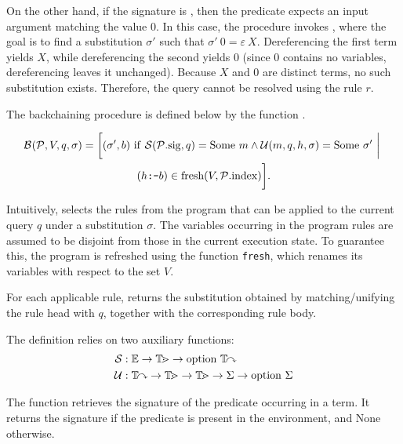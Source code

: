 On the other hand, if the signature is , then the predicate
expects an input argument matching the value $0$. In this case, the procedure
invokes , where the goal is to find a
substitution $\sigma'$ such that $\sigma'\ 0 = \varepsilon\ X$. Dereferencing the
first term yields $X$, while dereferencing the second yields $0$ (since $0$
contains no variables, dereferencing leaves it unchanged). Because $X$ and $0$
are distinct terms, no such substitution exists. Therefore, the query cannot be
resolved using the rule $r$.

The backchaining procedure is defined below by the function \backchain.

\begin{definition}
\begin{multline*}
\backchain(\prog, V, q, \sigma) =
\bigg[
(\sigma', b)\ \mathrm{if}\
 \getmode(\prog.\mathrm{sig}, q) = \mathrm{Some}\ m \land \select(m, q, h, \sigma) = \mathrm{Some}\ \sigma'
\ \bigg|\ \\
(\clauseCmd{h}{}{b}) \in \text{fresh}(V, \prog.\mathrm{index})
\bigg].
\end{multline*}
\end{definition}

Intuitively, \backchain selects the rules from the program 
that can be applied to the current
query $q$ under a substitution $\sigma$. The variables occurring in the program
rules are assumed to be disjoint from those in the current execution state. To
guarantee this, the program is refreshed using the function \texttt{fresh},
which renames its variables with respect to the set $V$.

For each applicable rule, \backchain returns the substitution obtained by
matching/unifying the rule head with $q$, together with the corresponding
rule body.

The definition relies on two auxiliary functions:
\begin{align*}
  \mathcal{S} &: \mathbb{E} \to \mathbb{T\!m} \to \mathrm{option}\ \mathbb{T\!y} \\
  \mathcal{U}  &: \mathbb{T\!y} \to \mathbb{T\!m} \to \mathbb{T\!m} \to
              \Sigma \to \mathrm{option}\ \Sigma
\end{align*}

The function \getmode retrieves the signature of the predicate occurring in a
term. It returns the signature if the predicate is present in the environment,
and None otherwise.

